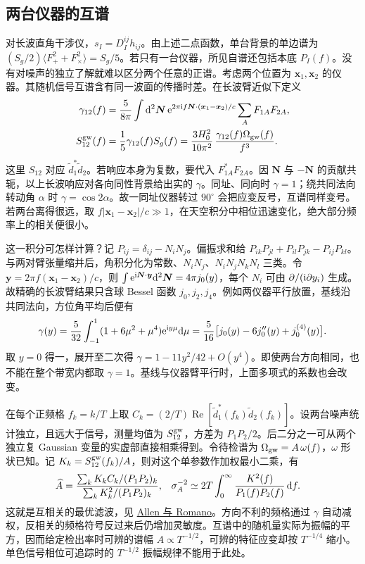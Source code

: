 \subsection{两台仪器的互谱}
对长波直角干涉仪，$s_I=D_I^{ij}h_{ij}$。由上述二点函数，单台背景的单边谱为 $(S_g/2)\langle F_+^2+F_\times^2\rangle=S_g/5$。若只有一台仪器，所见自谱还包括本底 $P_I(f)$。没有对噪声的独立了解就难以区分两个任意的正谱。考虑两个位置为 $\bm x_1,\bm x_2$ 的仪器。其随机信号互谱含有同一波面的传播时差。在长波臂近似下定义
\begin{align}
 \gamma_{12}(f)&=\frac{5}{8\pi}\int \dd^2\bm N\,
 \mathrm{e}^{2\pi\mathrm{i} f\bm N\cdot(\bm x_1-\bm x_2)/c}
 \sum_A F_{1A}F_{2A},\nonumber\\
 S_{12}^{\rm gw}(f)&=\frac{1}{5}\gamma_{12}(f)S_g(f)
 =\frac{3H_0^2}{10\pi^2}\,\frac{\gamma_{12}(f)\Omega_{\rm gw}(f)}{f^3}.
 \label{eq:gw-b-cross}
\end{align}
这里 $S_{12}$ 对应 $\tilde d_1^*\tilde d_2$。若响应本身为复数，要代入 $F_{1A}^*F_{2A}$。因 $\bm N$ 与 $-\bm N$ 的贡献共轭，以上长波响应对各向同性背景给出实的 $\gamma$。同址、同向时 $\gamma=1$；绕共同法向转动角 $\alpha$ 时 $\gamma=\cos2\alpha$。故一同址仪器转过 $90^\circ$ 会把应变反号，互谱同样变号。若两台离得很远，取 $f|\bm x_1-\bm x_2|/c\gg1$，在天空积分中相位迅速变化，绝大部分频率上的相关便很小。

这一积分可怎样计算？记 $P_{ij}=\delta_{ij}-N_iN_j$。偏振求和给 $P_{ik}P_{jl}+P_{il}P_{jk}-P_{ij}P_{kl}$。与两对臂张量缩并后，角积分化为常数、$N_iN_j$、$N_iN_jN_kN_l$ 三类。令 $\bm y=2\pi f(\bm x_1-\bm x_2)/c$，则 $\int\mathrm{e}^{\mathrm{i}\bm N\cdot\bm y}\dd^2\bm N=4\pi j_0(y)$，每个 $N_i$ 可由 $\partial/(\mathrm{i}\partial y_i)$ 生成。故精确的长波臂结果只含球 Bessel 函数 $j_0,j_2,j_4$。例如两仪器平行放置，基线沿共同法向，方位角平均后便有
\[
 \gamma(y)=\frac{5}{32}\int_{-1}^{1}
 (1+6\mu^2+\mu^4)\mathrm{e}^{\mathrm{i} y\mu}\dd\mu
 =\frac{5}{16}\big[j_0(y)-6j_0''(y)+j_0^{(4)}(y)\big].
\]
取 $y=0$ 得一，展开至二次得 $\gamma=1-11y^2/42+O(y^4)$。即使两台方向相同，也不能在整个带宽内都取 $\gamma=1$。基线与仪器臂平行时，上面多项式的系数也会改变。

在每个正频格 $f_k=k/T$ 上取 $C_k=(2/T)\operatorname{Re}[\tilde d_1^*(f_k)\tilde d_2(f_k)]$。设两台噪声统计独立，且远大于信号，测量均值为 $S_{12}^{\rm gw}$，方差为 $P_1P_2/2$。后二分之一可从两个独立复 Gaussian 变量的实虚部直接相乘得到。令待检谱为 $\Omega_{\rm gw}=A\,\omega(f)$，$\omega$ 形状已知。记 $K_k=S_{12}^{\rm gw}(f_k)/A$，则对这个单参数作加权最小二乘，有
\begin{align*}
 \widehat A&=\frac{\sum_k K_k C_k/(P_1P_2)_k}{\sum_k K_k^2/(P_1P_2)_k},&
 \sigma_A^{-2}&\simeq 2T\int_0^\infty\frac{K^2(f)}{P_1(f)P_2(f)}\,\dd f .
\end{align*}
这就是互相关的最优滤波，见 \href{https://arxiv.org/abs/gr-qc/9710117}{Allen 与 Romano}。方向不利的频格通过 $\gamma$ 自动减权，反相关的频格符号反过来后仍增加灵敏度。互谱中的随机量实际为振幅的平方，因而给定检出率时可辨的谱幅 $A\propto T^{-1/2}$，可辨的特征应变却按 $T^{-1/4}$ 缩小。单色信号相位可追踪时的 $T^{-1/2}$ 振幅规律不能用于此处。

